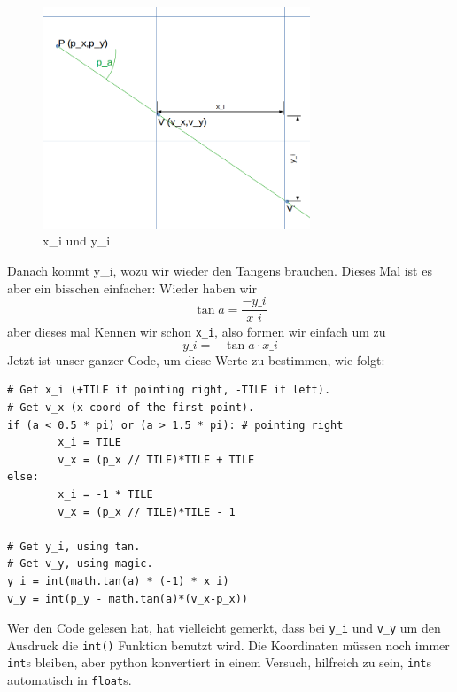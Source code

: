 \documentclass[a4paper,12pt]{report}
\begin{document}
\begin{figure}[htbp] 
        \centering
        \includegraphics[width=8cm]{vcheck2.png} 
        \caption{x\_i und y\_i}
\end{figure}
Danach kommt y\_i, wozu wir wieder den Tangens brauchen. Dieses Mal ist es aber ein bisschen einfacher: Wieder haben wir \[\tan a = \frac{-y\_i}{x\_i}\]aber dieses mal Kennen wir schon \texttt{x\_i}, also formen wir einfach um zu \[y\_i = -\tan a \cdot x\_i\]
Jetzt ist unser ganzer Code, um diese Werte zu bestimmen, wie folgt:
\begin{Verbatim}[baselinestretch=1.0, xleftmargin=1cm]
# Get x_i (+TILE if pointing right, -TILE if left).
# Get v_x (x coord of the first point).
if (a < 0.5 * pi) or (a > 1.5 * pi): # pointing right
        x_i = TILE
        v_x = (p_x // TILE)*TILE + TILE
else:
        x_i = -1 * TILE
        v_x = (p_x // TILE)*TILE - 1

# Get y_i, using tan.
# Get v_y, using magic.
y_i = int(math.tan(a) * (-1) * x_i)
v_y = int(p_y - math.tan(a)*(v_x-p_x))
\end{Verbatim}

Wer den Code gelesen hat, hat vielleicht gemerkt, dass bei \texttt{y\_i} und \texttt{v\_y} um den Ausdruck die \texttt{int()} Funktion benutzt wird. Die Koordinaten m\"ussen noch immer \texttt{int}s bleiben, aber python konvertiert in einem Versuch, hilfreich zu sein, \texttt{int}s automatisch in \texttt{float}s.
\end{document}
